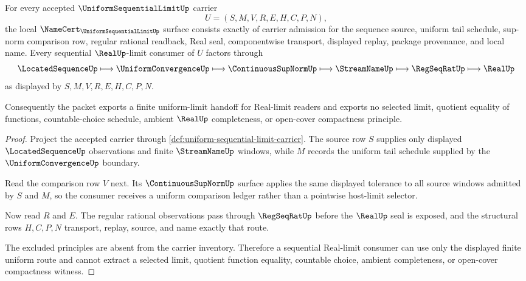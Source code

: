 \begin{theorem}\label{thm:uniform-sequential-limit-namecert-obligations}
For every accepted $\UniformSequentialLimitUp$ carrier
$$
U=(S,M,V,R,E,H,C,P,N),
$$
the local $\NameCert_{\UniformSequentialLimitUp}$ surface consists exactly of carrier admission for the sequence source, uniform tail schedule, sup-norm comparison row, regular rational readback, Real seal, componentwise transport, displayed replay, package provenance, and local name. Every sequential $\RealUp$-limit consumer of $U$ factors through
$$
\LocatedSequenceUp \longmapsto \UniformConvergenceUp \longmapsto \ContinuousSupNormUp \longmapsto \StreamNameUp \longmapsto \RegSeqRatUp \longmapsto \RealUp
$$
as displayed by $S,M,V,R,E,H,C,P,N$.

Consequently the packet exports a finite uniform-limit handoff for Real-limit readers and exports no selected limit, quotient equality of functions, countable-choice schedule, ambient $\RealUp$ completeness, or open-cover compactness principle.
\end{theorem}
\begin{proof}
Project the accepted carrier through \autoref{def:uniform-sequential-limit-carrier}. The source row $S$ supplies only displayed $\LocatedSequenceUp$ observations and finite $\StreamNameUp$ windows, while $M$ records the uniform tail schedule supplied by the $\UniformConvergenceUp$ boundary.

Read the comparison row $V$ next. Its $\ContinuousSupNormUp$ surface applies the same displayed tolerance to all source windows admitted by $S$ and $M$, so the consumer receives a uniform comparison ledger rather than a pointwise host-limit selector.

Now read $R$ and $E$. The regular rational observations pass through $\RegSeqRatUp$ before the $\RealUp$ seal is exposed, and the structural rows $H,C,P,N$ transport, replay, source, and name exactly that route.

The excluded principles are absent from the carrier inventory. Therefore a sequential Real-limit consumer can use only the displayed finite uniform route and cannot extract a selected limit, quotient function equality, countable choice, ambient completeness, or open-cover compactness witness.
\end{proof}


